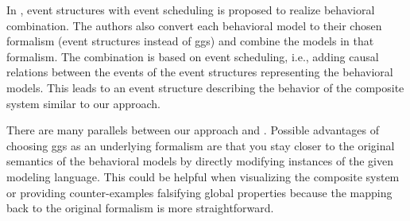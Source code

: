 \documentclass[a4paper]{easychair}
\begin{document}
In \cite{kienzleUnifyingFrameworkHomogeneous2019}, event structures with event scheduling is proposed to realize behavioral combination.
The authors also convert each behavioral model to their chosen formalism (event structures instead of \glspl*{gg}) and combine the models in that formalism.
The combination is based on event scheduling, i.e., adding causal relations between the events of the event structures representing the behavioral models.
This leads to an event structure describing the behavior of the composite system similar to our approach.

There are many parallels between our approach and \cite{kienzleUnifyingFrameworkHomogeneous2019}.
Possible advantages of choosing \glspl*{gg} as an underlying formalism are that you stay closer to the original semantics of the behavioral models by directly modifying instances of the given modeling language.
This could be helpful when visualizing the composite system or providing counter-examples falsifying global properties because the mapping back to the original formalism is more straightforward.





%
%
%



\end{document}
